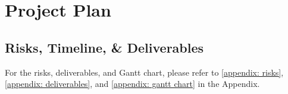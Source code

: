\section{Project Plan}
\label{section: project plan}


\subsection{Risks, Timeline, \& Deliverables}
\label{Deliverables and Timeline}
For the risks, deliverables, and Gantt chart, please refer to \cref{appendix: risks}, \cref{appendix: deliverables}, and \cref{appendix: gantt chart} in the Appendix.

